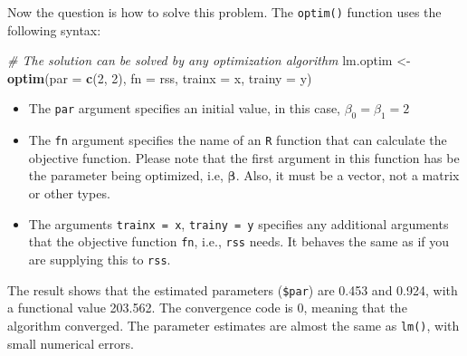 \documentclass[
]{book}
\newenvironment{Shaded}{\begin{snugshade}}{\end{snugshade}}
\newcommand{\AttributeTok}[1]{\textcolor[rgb]{0.13,0.29,0.53}{#1}}
\newcommand{\CommentTok}[1]{\textcolor[rgb]{0.56,0.35,0.01}{\textit{#1}}}
\newcommand{\DecValTok}[1]{\textcolor[rgb]{0.00,0.00,0.81}{#1}}
\newcommand{\DocumentationTok}[1]{\textcolor[rgb]{0.56,0.35,0.01}{\textbf{\textit{#1}}}}
\newcommand{\FunctionTok}[1]{\textcolor[rgb]{0.13,0.29,0.53}{\textbf{#1}}}
\newcommand{\NormalTok}[1]{#1}
\newcommand{\OtherTok}[1]{\textcolor[rgb]{0.56,0.35,0.01}{#1}}
\providecommand{\tightlist}{%
  \setlength{\itemsep}{0pt}\setlength{\parskip}{0pt}}
\theoremstyle{definition}
\theoremstyle{definition}
\theoremstyle{definition}
\theoremstyle{definition}
\theoremstyle{remark}
\begin{document}
Now the question is how to solve this problem. The \texttt{optim()} function uses the following syntax:

\begin{Shaded}
\begin{Highlighting}[]
    \CommentTok{\# The solution can be solved by any optimization algorithm }
\NormalTok{    lm.optim }\OtherTok{\textless{}{-}} \FunctionTok{optim}\NormalTok{(}\AttributeTok{par =} \FunctionTok{c}\NormalTok{(}\DecValTok{2}\NormalTok{, }\DecValTok{2}\NormalTok{), }\AttributeTok{fn =}\NormalTok{ rss, }\AttributeTok{trainx =}\NormalTok{ x, }\AttributeTok{trainy =}\NormalTok{ y)}
\end{Highlighting}
\end{Shaded}

\begin{itemize}
\tightlist
\item
  The \texttt{par} argument specifies an initial value, in this case, \(\beta_0 = \beta_1 = 2\)
\item
  The \texttt{fn} argument specifies the name of an \texttt{R} function that can calculate the objective function. Please note that the first argument in this function has be the parameter being optimized, i.e, \(\boldsymbol \beta\). Also, it must be a vector, not a matrix or other types.
\item
  The arguments \texttt{trainx\ =\ x}, \texttt{trainy\ =\ y} specifies any additional arguments that the objective function \texttt{fn}, i.e., \texttt{rss} needs. It behaves the same as if you are supplying this to \texttt{rss}.
\end{itemize}

\begin{Shaded}
\end{Shaded}

The result shows that the estimated parameters (\texttt{\$par}) are 0.453 and 0.924, with a functional value 203.562. The convergence code is 0, meaning that the algorithm converged. The parameter estimates are almost the same as \texttt{lm()}, with small numerical errors.
\end{document}
